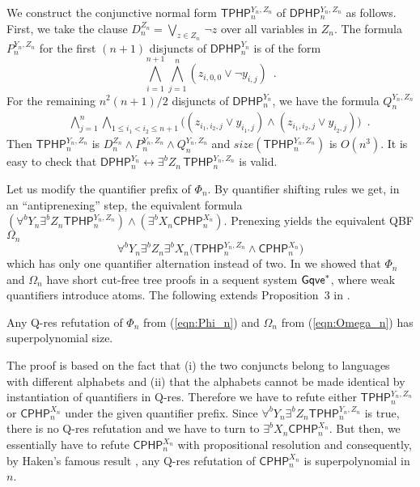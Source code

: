\documentclass{llncs}
\newcommand{\qres}{\mbox{\sf Q-res}}
\newcommand{\Gqvetree}{$\mbox{{\sf Gqve}}^*$}
\newcommand{\lequiv}{\leftrightarrow}
\newcommand{\size}[1]{\mathit{size}(#1)}
\newcommand{\PHPText}{CPHP}
\newcommand{\PHPTextp}{DPHP}
\newcommand{\TPHPTextp}{TPHP}
\newcommand{\PHPVar}[2]{\mbox{$\mathsf{\PHPText}_{#1}^{#2}$}}
\newcommand{\PHPpVar}[2]{\mbox{$\mathsf{\PHPTextp}_{#1}^{#2}$}}
\newcommand{\TPHPpVar}[2]{\mbox{$\mathsf{\TPHPTextp}_{#1}^{#2}$}}
\begin{document}
We construct the conjunctive normal form $\TPHPpVar{n}{Y_n,Z_n}$ of
$\PHPpVar{n}{Y_n,Z_n}$ as follows.  First, we take the clause
$D_n^{Z_n} = \bigvee_{z\in Z_n} \, \neg z$ over all variables in
$Z_n$.
The formula $P_n^{Y_n,Z_n}$ for the first $(n+1)$
disjuncts of \PHPpVar{n}{Y_n} is of the form
\begin{equation}
\nonumber
  \bigwedge_{i=1}^{n+1} \bigwedge_{j=1}^{n} (z_{i,0,0} \lor \neg y_{i,j})
\enspace . 
\end{equation}
For the remaining $n^2(n+1)/2$ disjuncts of \PHPpVar{n}{Y_n}, we have
the formula $Q_n^{Y_n,Z_n}$
\begin{eqnarray*}
& &  
\bigwedge_{j=1}^{n} \bigwedge_{1\leq i_1<i_2\leq n+1} 
\big((z_{i_1,i_2,j} \lor y_{i_1,j}) \land
  (z_{i_1,i_2,j} \lor y_{i_2,j})\big)\enspace .
\end{eqnarray*}
Then \TPHPpVar{n}{Y_n,Z_n} is $D_n^{Z_n} \land P_n^{Y_n,Z_n} \land
Q_n^{Y_n,Z_n}$ and $\size{\TPHPpVar{n}{Y_n,Z_n}}$ is $O(n^3)$.  
It is easy to check that $\PHPpVar{n}{Y_n} \lequiv \exists^b Z_n \,
\TPHPpVar{n}{Y_n,Z_n} $ is valid.

Let us  modify the quantifier prefix of $\Phi_n$. By
quantifier shifting rules we get, in an
``antiprenexing'' step, the equivalent formula
$(\forall^b Y_n \exists^b Z_n \TPHPpVar{n}{Y_n,Z_n}) \land 
( \exists^b X_n \PHPVar{n}{X_n})$.
Prenexing yields the equivalent QBF $\Omega_n$
\begin{equation}\label{eqn:Omega_n}
\forall^b Y_n \exists^b Z_n \exists^b X_n \big( \TPHPpVar{n}{Y_n,Z_n}
\land \PHPVar{n}{X_n} \big)
\end{equation}
which has only one quantifier alternation instead of two.  In
\cite{DBLP:conf/sat/Egly12} we showed that $\Phi_n$ and $\Omega_n$
have short cut-free tree proofs in a sequent system \Gqvetree, where
weak quantifiers introduce atoms.  The following extends Proposition~3
in \cite{DBLP:conf/sat/Egly12}.

\begin{proposition}\label{prop:SAT12:prop3}
Any \qres{} refutation of $\Phi_n$ from (\ref{eqn:Phi_n}) and
$\Omega_n$ from (\ref{eqn:Omega_n}) has superpolynomial size.
\end{proposition}
The proof is based on the fact that (i) the two conjuncts belong to
languages with different alphabets and (ii) that the alphabets cannot
be made identical by instantiation of quantifiers in \qres. Therefore
we have to refute either \TPHPpVar{n}{Y_n,Z_n} or \PHPVar{n}{X_n}
under the given quantifier prefix.  Since $\forall^b Y_n \exists^b
Z_n\TPHPpVar{n}{Y_n,Z_n}$ is true, there is no \qres{} refutation and
we have to turn to $\exists^b X_n \PHPVar{n}{X_n}$.  But then, we
essentially have to refute \PHPVar{n}{X_n} with propositional
resolution and consequently, by Haken's famous result
\cite{DBLP:journals/tcs/Haken85}, any \qres{} refutation of
$\PHPVar{n}{X_n}$ is superpolynomial in $n$.
\end{document}
